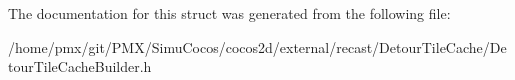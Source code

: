 The documentation for this struct was generated from the following file\+:\begin{DoxyCompactItemize}
\item 
/home/pmx/git/\+P\+M\+X/\+Simu\+Cocos/cocos2d/external/recast/\+Detour\+Tile\+Cache/Detour\+Tile\+Cache\+Builder.\+h\end{DoxyCompactItemize}
